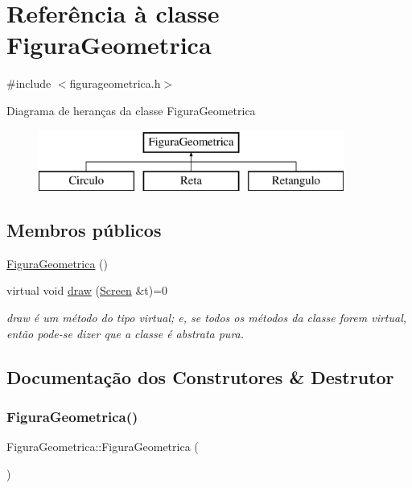 \hypertarget{class_figura_geometrica}{}\section{Referência à classe Figura\+Geometrica}
\label{class_figura_geometrica}


{\ttfamily \#include $<$figurageometrica.\+h$>$}

Diagrama de heranças da classe Figura\+Geometrica\begin{figure}[H]
\begin{center}
\leavevmode
\includegraphics[height=2.000000cm]{class_figura_geometrica}
\end{center}
\end{figure}
\subsection*{Membros públicos}
\begin{DoxyCompactItemize}
\item 
\hyperlink{class_figura_geometrica_a81d7c7efaea511e60a15f5a363138dd9}{Figura\+Geometrica} ()
\item 
virtual void \hyperlink{class_figura_geometrica_a06404670d06d28d12f5f386901186925}{draw} (\hyperlink{class_screen}{Screen} \&t)=0
\begin{DoxyCompactList}\small\item\em draw é um método do tipo virtual; e, se todos os métodos da classe forem virtual, então pode-\/se dizer que a classe é abstrata pura. \end{DoxyCompactList}\end{DoxyCompactItemize}


\subsection{Documentação dos Construtores \& Destrutor}
\mbox{\label{class_figura_geometrica_a81d7c7efaea511e60a15f5a363138dd9}} 
\subsubsection{\texorpdfstring{Figura\+Geometrica()}{FiguraGeometrica()}}
{\footnotesize\ttfamily Figura\+Geometrica\+::\+Figura\+Geometrica (\begin{DoxyParamCaption}{ }\end{DoxyParamCaption})}


